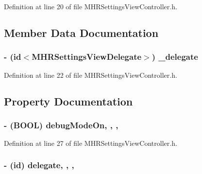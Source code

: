Definition at line 20 of file M\+H\+R\+Settings\+View\+Controller.\+h.



\subsection{Member Data Documentation}
\hypertarget{interface_m_h_r_settings_view_controller_a6fa685e4f9358a047d6f1cfd77f7ac0f}{
\subsubsection[{\+\_\+delegate}]{\setlength{\rightskip}{0pt plus 5cm}-\/ (id$<${\bf M\+H\+R\+Settings\+View\+Delegate}$>$) \+\_\+delegate\hspace{0.3cm}{\ttfamily [protected]}}}\label{interface_m_h_r_settings_view_controller_a6fa685e4f9358a047d6f1cfd77f7ac0f}


Definition at line 22 of file M\+H\+R\+Settings\+View\+Controller.\+h.



\subsection{Property Documentation}
\hypertarget{interface_m_h_r_settings_view_controller_abb8745a6f5f7529e69628d8f5f4f068e}{
\subsubsection[{debug\+Mode\+On}]{\setlength{\rightskip}{0pt plus 5cm}-\/ (B\+O\+O\+L) debug\+Mode\+On\hspace{0.3cm}{\ttfamily [read]}, {\ttfamily [write]}, {\ttfamily [nonatomic]}, {\ttfamily [assign]}}}\label{interface_m_h_r_settings_view_controller_abb8745a6f5f7529e69628d8f5f4f068e}


Definition at line 27 of file M\+H\+R\+Settings\+View\+Controller.\+h.

\hypertarget{interface_m_h_r_settings_view_controller_a44380e171f6d773f58dc158ff58d47aa}{
\subsubsection[{delegate}]{\setlength{\rightskip}{0pt plus 5cm}-\/ (id) delegate\hspace{0.3cm}{\ttfamily [read]}, {\ttfamily [write]}, {\ttfamily [nonatomic]}, {\ttfamily [strong]}}}\label{interface_m_h_r_settings_view_controller_a44380e171f6d773f58dc158ff58d47aa}


